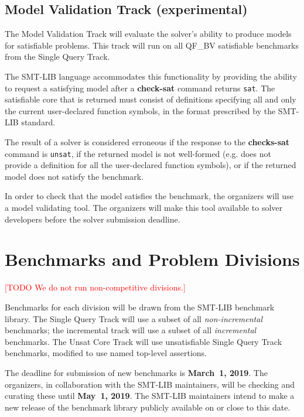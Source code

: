 \documentclass[12pt]{article}
\newcommand{\akey}[1]{\textbf{#1}}
\newcommand{\rem}[1]{\textcolor{red}{[#1]}}
\newcommand{\todo}[1]{\rem{TODO #1}}
\newcommand{\main}{Single Query\xspace}
\newcommand{\ucore}{Unsat Core\xspace}
\newcommand{\mval}{Model Validation\xspace}
\begin{document}
\subsection{\mval Track (experimental)}
\label{sec:exec:model}
The \mval Track will evaluate the solver's ability to produce models
for satisfiable problems. This track will run on all QF\_BV satisfiable benchmarks
from the \main Track.

The SMT-LIB language accommodates this functionality by providing the ability to
request a satisfying model after a \akey{check-sat} command returns \texttt{sat}.
The satisfiable core that is returned must consist of definitions specifying all
and only the current user-declared function symbols, in the format prescribed by
the SMT-LIB standard.

The result of a solver is considered erroneous if the response to the
\akey{checks-sat} command is \texttt{unsat}, if the returned model is not
well-formed (e.g. does not provide a definition for all the user-declared function
symbols), or if the returned model does not satisfy the benchmark.

In order to check that the model satisfies the benchmark, the organizers will use
a model validating tool. The organizers will make this tool available to solver
developers before the solver submission deadline.



\section{Benchmarks and Problem Divisions}

\todo{We do not run non-competitive divisions.}


%
Benchmarks for each division will be drawn from the SMT-LIB benchmark
library.  The \main Track will use a subset of all
\emph{non-incremental} benchmarks; the incremental track will use a
subset of all \emph{incremental} benchmarks.  The \ucore Track
will use unsatisfiable \main Track benchmarks, modified to use named
top-level assertions.

%
The deadline for submission of new benchmarks is {\bf March~1, 2019}.
The organizers, in collaboration with the SMT-LIB maintainers, will be
checking and curating these until {\bf May~1, 2019}.  The SMT-LIB
maintainers intend to make a new release of the benchmark library
publicly available on or close to this date.
\end{document}
